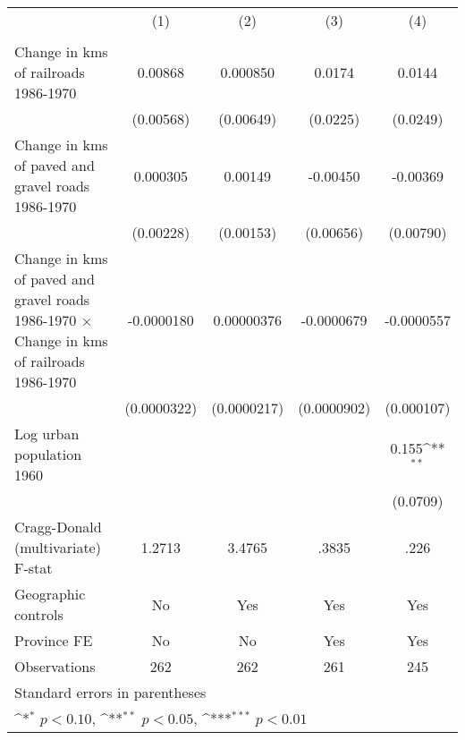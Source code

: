 {
\def\sym#1{\ifmmode^{#1}\else\(^{#1}\)\fi}
\begin{tabular}{l*{4}{c}}
\hline\hline
                &\multicolumn{1}{c}{(1)}&\multicolumn{1}{c}{(2)}&\multicolumn{1}{c}{(3)}&\multicolumn{1}{c}{(4)}\\
                &\multicolumn{1}{c}{}&\multicolumn{1}{c}{}&\multicolumn{1}{c}{}&\multicolumn{1}{c}{}\\
\hline
Change in kms of railroads 1986-1970&  0.00868         & 0.000850         &   0.0174         &   0.0144         \\
                &(0.00568)         &(0.00649)         & (0.0225)         & (0.0249)         \\
[1em]
Change in kms of paved and gravel roads 1986-1970& 0.000305         &  0.00149         & -0.00450         & -0.00369         \\
                &(0.00228)         &(0.00153)         &(0.00656)         &(0.00790)         \\
[1em]
Change in kms of paved and gravel roads 1986-1970 $\times$ Change in kms of railroads 1986-1970&-0.0000180         &0.00000376         &-0.0000679         &-0.0000557         \\
                &(0.0000322)         &(0.0000217)         &(0.0000902)         &(0.000107)         \\
[1em]
Log urban population 1960&                  &                  &                  &    0.155\sym{**} \\
                &                  &                  &                  & (0.0709)         \\
\hline
Cragg-Donald (multivariate) F-stat&   1.2713         &   3.4765         &    .3835         &     .226         \\
Geographic controls&       No         &      Yes         &      Yes         &      Yes         \\
Province FE     &       No         &       No         &      Yes         &      Yes         \\
Observations    &      262         &      262         &      261         &      245         \\
\hline\hline
\multicolumn{5}{l}{\footnotesize Standard errors in parentheses}\\
\multicolumn{5}{l}{\footnotesize \sym{*} \(p<0.10\), \sym{**} \(p<0.05\), \sym{***} \(p<0.01\)}\\
\end{tabular}
}
